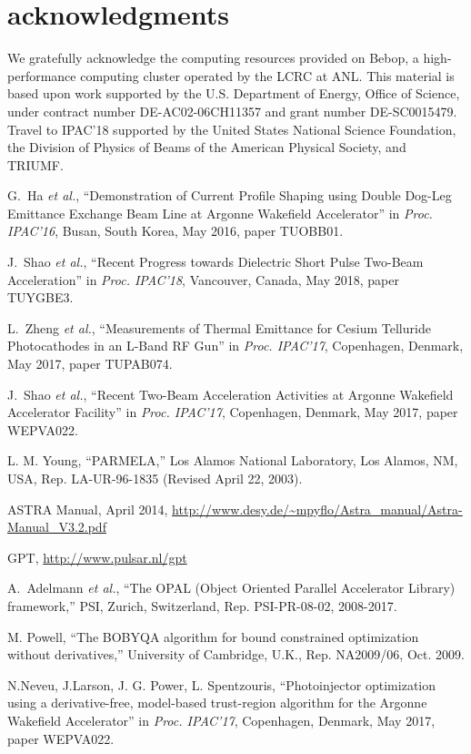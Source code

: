 \documentclass[letterpaper,  %
              ]{jacow-2_3}   %
\begin{document}
\section{acknowledgments}
We gratefully acknowledge the computing resources
provided on Bebop, a high-performance computing cluster
operated by the LCRC at ANL.
This material is based upon work supported by the 
U.S. Department of Energy, Office of Science, under 
contract number DE-AC02-06CH11357 and grant number DE-SC0015479. 
Travel to IPAC'18 supported by the United States National Science Foundation, 
the Division of Physics of Beams of the American Physical Society, and TRIUMF.

\begin{thebibliography}{99}
G.~Ha \emph{et al.}, “Demonstration of Current Profile 
Shaping using Double Dog-Leg Emittance Exchange Beam 
Line at Argonne Wakefield Accelerator”
in \textit{Proc. IPAC’16}, 
Busan, South Korea, May 2016, 
paper TUOBB01.

J.~Shao \emph{et al.}, “Recent Progress towards Dielectric Short Pulse Two-Beam Acceleration”
in \textit{Proc. IPAC’18}, 
Vancouver, Canada, May 2018, 
paper TUYGBE3.

L.~Zheng \emph{et al.}, “Measurements of Thermal Emittance 
for Cesium Telluride Photocathodes in an L-Band RF Gun”
in \textit{Proc. IPAC’17}, 
Copenhagen, Denmark, May 2017, 
paper TUPAB074.

J.~Shao \emph{et al.}, “Recent Two-Beam 
Acceleration Activities at Argonne Wakefield Accelerator Facility”
in \textit{Proc. IPAC’17}, 
Copenhagen, Denmark, May 2017, 
paper WEPVA022.

L. M. Young, “PARMELA,”
Los Alamos National Laboratory, 
Los Alamos, NM, USA,
Rep. LA-UR-96-1835 (Revised April 22, 2003).

ASTRA Manual, April 2014, 
\url{http://www.desy.de/~mpyflo/Astra_manual/Astra-Manual_V3.2.pdf}

GPT,  \url{http://www.pulsar.nl/gpt}

A.~Adelmann \emph{et al.},
“The OPAL (Object Oriented Parallel Accelerator Library) framework,”
PSI, Zurich, Switzerland,
Rep. PSI-PR-08-02, 2008-2017.

M. Powell, “The BOBYQA algorithm for bound constrained
optimization without derivatives,” University of Cambridge,
U.K., Rep. NA2009/06, Oct. 2009.

N.Neveu, J.Larson, J. G. Power, L. Spentzouris, 
“Photoinjector optimization using a derivative-free, model-based trust-region algorithm for the Argonne Wakefield Accelerator”
in \textit{Proc. IPAC’17}, 
Copenhagen, Denmark, May 2017, 
paper WEPVA022.


\end{thebibliography}
\end{document}
